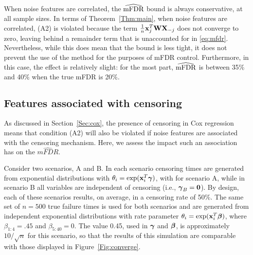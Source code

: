 When noise features are correlated, the $\widehat{\textrm{mFDR}}$ bound is always conservative, at all sample sizes.  In terms of Theorem~\ref{Thm:main}, when noise features are correlated, (A2) is violated because the term $\frac{1}{n}\mathbf{x}_j^T\mathbf{W}\mathbf{X}_{-j}$ does not converge to zero, leaving behind a remainder term that is unaccounted for in \eqref{eq:mfdr}.
Nevertheless, while this does mean that the bound is less tight, it does not prevent the use of the method for the purposes of mFDR control.
Furthermore, in this case, the effect is relatively slight: for the most part, $\widehat{\textrm{mFDR}}$ is between 35\% and 40\% when the true mFDR is 20\%.

\subsection{Features associated with censoring}

As discussed in Section~\ref{Sec:cox}, the presence of censoring in Cox regression means that condition (A2) will also be violated if noise features are associated with the censoring mechanism.  Here, we assess the impact such an association has on the $\widehat{mFDR}$.

Consider two scenarios, A and B. In each scenario censoring times are generated from exponential distributions with $\theta_{i} = \exp(\mathbf{x}_i^T \boldsymbol{\gamma})$, with
for scenario A, while in scenario B all variables are independent of censoring (i.e., $\boldsymbol{\gamma}_B = \mathbf{0}$).  By design, each of these scenarios results, on average, in a censoring rate of 50\%.  The same set of $n = 500$ true failure times is used for both scenarios and are generated from independent exponential distributions with rate parameter $\theta_i = \exp(\mathbf{x}_i^T \boldsymbol{\beta})$, where $\beta_{1:4} = .45$ and $\beta_{5:40} = 0$.  The value 0.45, used in $\boldsymbol{\gamma}$ and $\boldsymbol{\beta}$, is approximately $10/\sqrt{n}$ for this scenario, so that the results of this simulation are comparable with those displayed in Figure~\ref{Fig:converge}.


